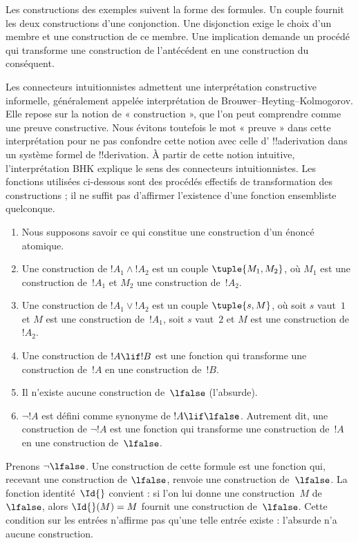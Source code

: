 \documentclass[../../../include/open-logic-section]{subfiles}
\begin{document}


Les constructions des exemples suivent la forme des formules.
Un couple fournit les deux constructions d'une conjonction.
Une disjonction exige le choix d'un membre et une construction
de ce membre. Une implication demande un procédé qui transforme
une construction de l'antécédent en une construction du conséquent.

Les connecteurs intuitionnistes admettent une interprétation
constructive informelle, généralement appelée interprétation de
Brouwer--Heyting--Kolmogorov. Elle repose sur la notion de
« construction », que l'on peut comprendre comme une preuve
constructive. Nous évitons toutefois le mot « preuve » dans cette
interprétation pour ne pas confondre cette notion avec celle d'%
!!a{derivation} dans un système formel de !!{derivation}.
À partir de cette notion intuitive, l'interprétation BHK explique
le sens des connecteurs intuitionnistes. Les fonctions utilisées
ci-dessous sont des procédés effectifs de transformation des
constructions ; il ne suffit pas d'affirmer l'existence d'une
fonction ensembliste quelconque.

\begin{enumerate}
\item Nous supposons savoir ce qui constitue une construction
  d'un énoncé atomique.
\item Une construction de $!A_1 \land !A_2$ est un couple
  $\tuple{M_1, M_2}$, où $M_1$ est une construction de~$!A_1$
  et $M_2$ une construction de~$!A_2$.
\item Une construction de $!A_1 \lor !A_2$ est un couple
  $\tuple{s, M}$, où soit $s$ vaut~$1$ et $M$ est une construction
  de~$!A_1$, soit $s$ vaut~$2$ et $M$ est une construction de~$!A_2$.
\item Une construction de $!A \lif !B$ est une fonction qui
  transforme une construction de~$!A$ en une construction de~$!B$.
\item Il n'existe aucune construction de~$\lfalse$ (l'absurde).
\item $\lnot !A$ est défini comme synonyme de $!A \lif \lfalse$.
  Autrement dit, une construction de $\lnot !A$ est une fonction
  qui transforme une construction de~$!A$ en une construction
  de~$\lfalse$.
\end{enumerate}

\begin{ex}
Prenons $\lnot \lfalse$. Une construction de cette formule est
une fonction qui, recevant une construction de $\lfalse$, renvoie
une construction de~$\lfalse$. La fonction identité~$\Id{}$
convient : si l'on lui donne une construction~$M$ de~$\lfalse$,
alors $\Id{}(M) = M$ fournit une construction de~$\lfalse$.
Cette condition sur les entrées n'affirme pas qu'une telle entrée
existe : l'absurde n'a aucune construction.
\end{ex}
\end{document}
